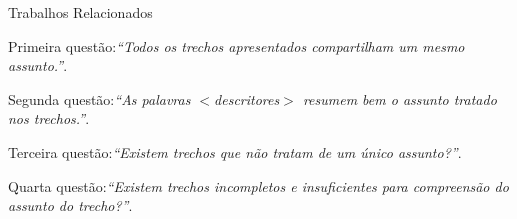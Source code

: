 \begin{frame}{Trabalhos Relacionados}
\begin{figure}[!h]
	\label{fig:influenciaExtSegQ4}
\end{figure}






Primeira questão:\textit{``Todos os trechos apresentados compartilham um mesmo assunto.''}. 


	Segunda questão:\textit{``As palavras \textit{$<$descritores$>$} resumem bem o assunto tratado nos trechos.''}.


	Terceira questão:\textit{``Existem trechos que não tratam de um único assunto?''}. 
	
	Quarta questão:\textit{``Existem trechos incompletos e insuficientes para compreensão do assunto do trecho?''}.

\begin{figure}[!h] \centering     %


\end{figure}
\end{frame}
